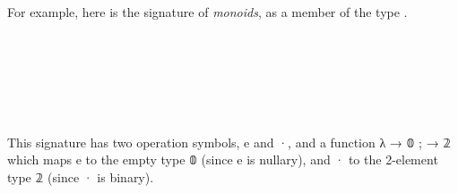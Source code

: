 \documentclass[a4paper,UKenglish,cleveref,autoref,thm-restate]{lipics-v2021}
\begin{document}
For example,
here is the signature of \emph{monoids}, as a member of the type \signatOV.
\ccpad
\begin{code}%
\>[0][@{}l@{\AgdaIndent{0}}]%
\>[1]\AgdaSpace{}%
\AgdaSpace{}%
\AgdaSymbol{:}\AgdaSpace{}%
\AgdaSpace{}%
\AgdaSpace{}%
\<%
\\
\>[1][@{}l@{\AgdaIndent{0}}]%
\>[2]\AgdaSpace{}%
\AgdaSymbol{:}\AgdaSpace{}%
\<%
\\
%
\>[2]\AgdaSpace{}%
\AgdaSymbol{:}\AgdaSpace{}%
\<%
\\
%
\\[\AgdaEmptyExtraSkip]%
%
\>[1]\AgdaSpace{}%
\AgdaSymbol{:}\AgdaSpace{}%
\AgdaSpace{}%
\AgdaSpace{}%
\<%
\\
%
\>[1]\AgdaSpace{}%
\AgdaSymbol{=}\AgdaSpace{}%
\AgdaSpace{}%
\AgdaOperator{\AgdaInductiveConstructor{,}}\AgdaSpace{}%
\AgdaSpace{}%
\AgdaSymbol{\{}\AgdaSpace{}%
\AgdaSpace{}%
\AgdaSpace{}%
\AgdaSymbol{;}\AgdaSpace{}%
\AgdaSpace{}%
\AgdaSpace{}%
\AgdaSpace{}%
\AgdaSymbol{\}}\<%
\end{code}
\ccpad
This signature has two operation symbols, \aic e and \aic ·, and a function \as λ \as{\{}  \as → \af 𝟘 \as ;  \as → \af 𝟚 \as{\}} which maps \aic e to the empty type \af 𝟘 (since \aic e is nullary), and \aic · to the 2-element type \af 𝟚 (since \aic · is binary).








\newcommand\sigOV{\AgdaFunction{Signature}\AgdaSpace{}\AgdaBound{𝓞}\AgdaSpace{}\AgdaBound{𝓥}\xspace}
\end{document}

